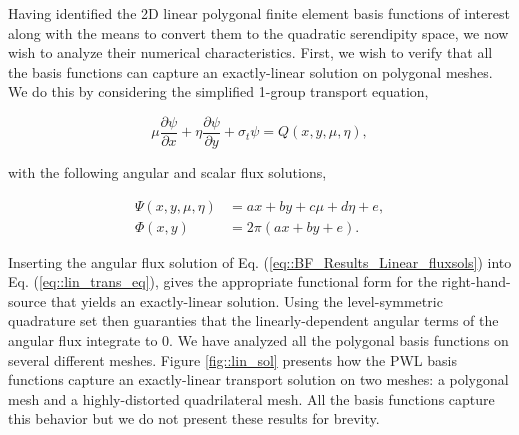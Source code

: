 \documentclass[11pt]{article}
\begin{document}
Having identified the 2D linear polygonal finite element basis functions of interest along with the means to convert them to the quadratic serendipity space, we now wish to analyze their numerical characteristics. First, we wish to verify that all the basis functions can capture an exactly-linear solution on polygonal meshes. We do this by considering the simplified 1-group transport equation,

\begin{equation}
\label{eq::lin_trans_eq}
\mu \frac{\partial  \psi}{\partial x} + \eta \frac{\partial  \psi}{\partial y} + \sigma_t \psi = Q(x,y,\mu,\eta),
\end{equation}

\noindent with the following angular and scalar flux solutions,

\begin{equation}
\label{eq::BF_Results_Linear_fluxsols}
\begin{aligned}
\Psi (x,y,\mu,\eta) &= ax + by + c \mu + d\eta + e,\\
\Phi (x,y) &= 2 \pi \left( ax + by  + e \right).
\end{aligned} 
\end{equation}

\noindent Inserting the angular flux solution of Eq. (\ref{eq::BF_Results_Linear_fluxsols}) into Eq. (\ref{eq::lin_trans_eq}), gives the appropriate functional form for the right-hand-source that yields an exactly-linear solution. Using the level-symmetric quadrature set then guaranties that the linearly-dependent angular terms of the angular flux integrate to 0. We have analyzed all the polygonal basis functions on several different meshes. Figure \ref{fig::lin_sol} presents how the PWL basis functions capture an exactly-linear transport solution on two meshes: a polygonal mesh and a highly-distorted quadrilateral mesh. All the basis functions capture this behavior but we do not present these results for brevity.
\end{document}
